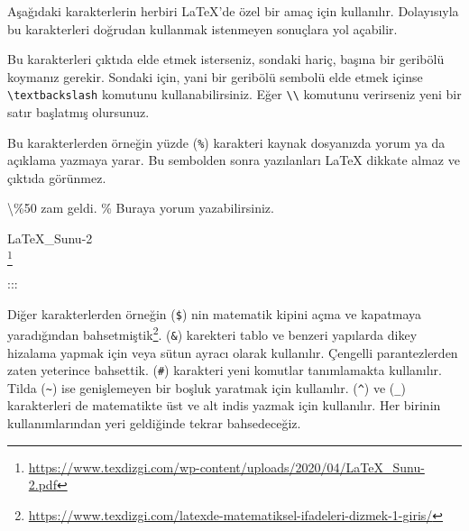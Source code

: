 \documentclass[
  10pt,
]{scrbook}
\newenvironment{Shaded}{\begin{snugshade}}{\end{snugshade}}
\newcommand{\NormalTok}[1]{#1}
\renewcommand{\href}[2]{#2\footnote{\url{#1}}}
\begin{document}
Aşağıdaki karakterlerin herbiri LaTeX'de özel bir amaç için kullanılır.
Dolayısıyla bu karakterleri doğrudan kullanmak istenmeyen sonuçlara yol
açabilir.

\begin{Shaded}
\begin{Highlighting}[]
\NormalTok{\#  $  \%   \&   \{   \}   \textasciitilde{}  \^{}  \_ \textbackslash{}}
\end{Highlighting}
\end{Shaded}

Bu karakterleri çıktıda elde etmek isterseniz, sondaki hariç, başına bir
geribölü koymanız gerekir. Sondaki için, yani bir geribölü sembolü elde
etmek içinse \texttt{\textbackslash{}textbackslash} komutunu kullanabilirsiniz. Eğer \texttt{\textbackslash{}\textbackslash{}}
komutunu verirseniz yeni bir satır başlatmış olursunuz.

Bu karakterlerden örneğin yüzde (\texttt{\%}) karakteri kaynak dosyanızda yorum
ya da açıklama yazmaya yarar. Bu sembolden sonra yazılanları LaTeX
dikkate almaz ve çıktıda görünmez.

\begin{Shaded}
\begin{Highlighting}[]
\NormalTok{\textbackslash{}\%50 zam geldi. }
\NormalTok{\% Buraya yorum yazabilirsiniz.}
\end{Highlighting}
\end{Shaded}

\href{https://www.texdizgi.com/wp-content/uploads/2020/04/LaTeX_Sunu-2.pdf}{LaTeX\_Sunu-2\\
}

:::

Diğer karakterlerden örneğin (\texttt{\$}) nin matematik kipini açma ve
kapatmaya yaradığından
\href{https://www.texdizgi.com/latexde-matematiksel-ifadeleri-dizmek-1-giris/}{bahsetmiştik}. (\texttt{\&}) karekteri tablo ve benzeri yapılarda dikey
hizalama yapmak için veya sütun ayracı olarak kullanılır. Çengelli
parantezlerden zaten yeterince bahsettik. (\texttt{\#}) karakteri yeni komutlar
tanımlamakta kullanılır. Tilda (\texttt{\textasciitilde{}}) ise genişlemeyen bir boşluk
yaratmak için kullanılır. (\texttt{\^{}}) ve (\texttt{\_}) karakterleri de matematikte üst
ve alt indis yazmak için kullanılır. Her birinin kullanımlarından yeri
geldiğinde tekrar bahsedeceğiz.

\backmatter

  

\printindex
\end{document}
